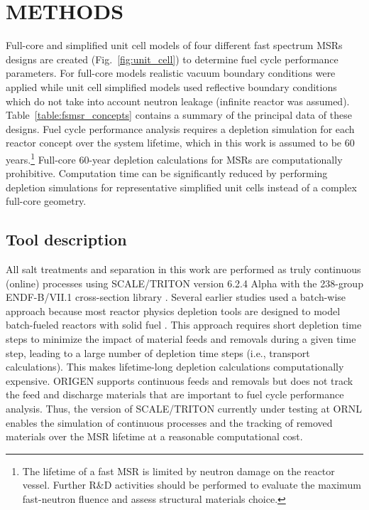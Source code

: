 \documentclass[letterpaper]{mandc2019}
\begin{document}
\section{METHODS}
\label{sec:methods}
Full-core and simplified unit cell models of four different fast spectrum \glspl{MSR} designs are created (Fig.~\ref{fig:unit_cell}) to determine fuel cycle performance parameters. For full-core models realistic vacuum boundary conditions were applied  while unit cell simplified models used reflective boundary conditions which do not take into account neutron leakage (infinite reactor was assumed). Table~\ref{table:fsmsr_concepts} contains a summary of the principal data of these designs. Fuel cycle performance analysis requires a depletion simulation for each reactor concept over the system lifetime, which in this work is assumed to be 60 years.\footnote{The lifetime of a fast \gls{MSR} is limited by neutron damage on the reactor vessel. Further R\&D activities should be performed to evaluate the maximum fast-neutron fluence and assess structural materials choice.} Full-core 60-year depletion calculations for \gls{MSR}s are computationally prohibitive. Computation time can be significantly reduced by performing depletion simulations for representative simplified unit cells instead of a complex full-core geometry.

\subsection{Tool description}
All salt treatments and separation in this work are performed as truly continuous (online) processes using SCALE/TRITON version 6.2.4 Alpha \cite{betzler_molten_2017-1} with the 238-group ENDF-B/VII.1 cross-section library \cite{rearden_scale_2016}. Several earlier studies used a batch-wise approach because most reactor physics depletion tools are designed to model batch-fueled reactors with solid fuel \cite{betzler_molten_2017,rykhlevskii_online_2017}. This approach requires short depletion time steps to minimize the impact of material feeds and removals during a given time step, leading to a large number of depletion time steps (i.e., transport calculations). This makes lifetime-long depletion calculations computationally expensive. ORIGEN \cite{gauld_isotopic_2011} supports continuous feeds and removals but does not track the feed and discharge materials that are important to fuel cycle performance analysis. Thus, the version of SCALE/TRITON currently under testing at \gls{ORNL} enables the simulation of continuous processes and the tracking of removed materials over the \gls{MSR} lifetime at a reasonable computational cost.
\end{document}
